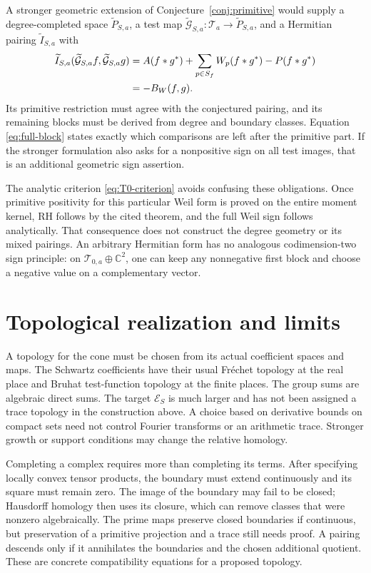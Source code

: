 \documentclass[11pt,letterpaper]{article}
\theoremstyle{definition}
\theoremstyle{remark}
\newcommand{\C}{\mathbb C}
\newcommand{\T}{\mathcal T}
\begin{document}
A stronger geometric extension of Conjecture~\ref{conj:primitive}
would supply a degree-completed space $\widetilde P_{S,a}$,
a test map $\widetilde{\mathcal G}_{S,a}:\T_a\to\widetilde P_{S,a}$,
and a Hermitian pairing $\widetilde I_{S,a}$ with
\begin{align}
 \widetilde I_{S,a}(\widetilde{\mathcal G}_{S,a}f,
                   \widetilde{\mathcal G}_{S,a}g)
 &=A(f*g^*)+\sum_{p\in S_f}W_p(f*g^*)-P(f*g^*)\notag\\
 &=-B_W(f,g).
 \label{eq:alltest-comparison}
\end{align}
Its primitive restriction must agree with the conjectured
pairing, and its remaining blocks must be derived from degree
and boundary classes. Equation \eqref{eq:full-block} states
exactly which comparisons are left after the primitive part.
If the stronger formulation also asks for a nonpositive sign on
all test images, that is an additional geometric sign assertion.

The analytic criterion \eqref{eq:T0-criterion} avoids confusing
these obligations. Once primitive positivity for this particular
Weil form is proved on the entire moment kernel, RH follows by
the cited theorem, and the full Weil sign follows analytically.
That consequence does not construct the degree geometry or its
mixed pairings. An arbitrary Hermitian form has no analogous
codimension-two sign principle: on $\T_{0,a}\oplus\C^2$, one
can keep any nonnegative first block and choose a negative value
on a complementary vector.

\section{Topological realization and limits}

A topology for the cone must be chosen from its actual coefficient
spaces and maps. The Schwartz coefficients have their usual
Fr\'echet topology at the real place and Bruhat test-function
topology at the finite places. The group sums are algebraic
direct sums. The target $\mathscr E_S$ is much larger and has
not been assigned a trace topology in the construction above.
A choice based on derivative bounds on compact sets need not
control Fourier transforms or an arithmetic trace. Stronger
growth or support conditions may change the relative homology.

Completing a complex requires more than completing its terms.
After specifying locally convex tensor products, the boundary
must extend continuously and its square must remain zero.
The image of the boundary may fail to be closed; Hausdorff
homology then uses its closure, which can remove classes that
were nonzero algebraically. The prime maps preserve closed
boundaries if continuous, but preservation of a primitive
projection and a trace still needs proof. A pairing descends
only if it annihilates the boundaries and the chosen additional
quotient. These are concrete compatibility equations for a
proposed topology.
\end{document}
